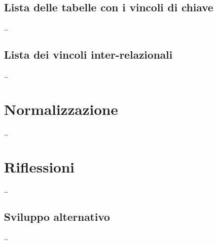 \documentclass{article}
\begin{document}
\subsection{Lista delle tabelle con i vincoli di chiave}
\large
\dots

\subsection{Lista dei vincoli inter-relazionali}
\large
\dots

\section{Normalizzazione}
\large
\dots

\section{Riflessioni}
\large
\dots

\subsection{Sviluppo alternativo}
\large
\dots
\end{document}
